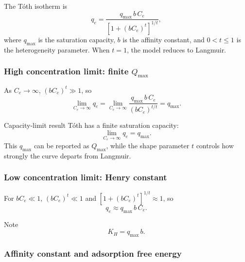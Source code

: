 \documentclass[journal=jacsat,manuscript=article]{achemso}
\begin{document}
The T\'{o}th isotherm is
\begin{equation}
	q_e = \frac{q_{\max}\, b\, C_e}{\left[1 + (b C_e)^t\right]^{1/t}},
	\label{eq:si_toth}
\end{equation}
where $q_{\max}$ is the saturation capacity, $b$ is the affinity
constant, and $0 < t \leq 1$ is the heterogeneity parameter.
When $t = 1$, the model reduces to Langmuir.

\subsubsection{High concentration limit: finite $Q_{\max}$}

As $C_e \to \infty$, $(bC_e)^t \gg 1$, so
\begin{equation}
	\lim_{C_e \to \infty} q_e
	= \lim_{C_e \to \infty}
	\frac{q_{\max}\, b\, C_e}{(b C_e)^{t/t}}
	= q_{\max}.
\end{equation}
\begin{greenbox}{Capacity-limit result}
	T\'{o}th has a finite saturation capacity:
	\begin{equation}
		\lim_{C_e \to \infty} q_e = q_{\max}.
	\end{equation}
	This \(q_{\max}\) can be reported as \(Q_{\max}\), while the shape
	parameter \(t\) controls how strongly the curve departs from Langmuir.
\end{greenbox}

\subsubsection{Low concentration limit: Henry constant}

For $bC_e \ll 1$, $(bC_e)^t \ll 1$ and $[1+(bC_e)^t]^{1/t} \approx 1$, so
\begin{equation}
	q_e \approx q_{\max}\, b\, C_e.
\end{equation}


\begin{bluebox}{Note}
	\begin{equation}
		K_H = q_{\max}\, b.
	\end{equation}
\end{bluebox}

\subsubsection{Affinity constant and adsorption free energy}
\end{document}
